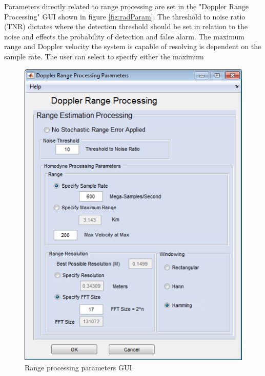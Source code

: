 Parameters directly related to range processing are set in the "Doppler Range Processing" GUI shown in figure \ref{fig:radParam}. The 
threshold to noise ratio (TNR) dictates where the detection threshold should be set in relation to the noise and effects the probability
of detection and false alarm. The maximum range and Doppler velocity the system is capable of resolving is dependent on the sample rate. 
The user can select to specify either the maximum  
\begin{figure}[!htb]
	\centering
	\includegraphics[width=.8\columnwidth]{figs/rangeParamGUI}
	\vspace{1em}
	\caption{Range processing parameters GUI.}
	\label{fig:rangeGUI}
\end{figure} 
